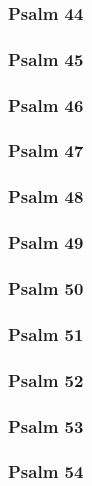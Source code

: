 \documentclass[10pt]{extarticle}
\begin{document}
\begin{multicols}{2}
\subsubsection{Psalm 44}

\newpage

\subsubsection{Psalm 45}

\newpage

\subsubsection{Psalm 46}

\newpage

\subsubsection{Psalm 47}

\newpage

\subsubsection{Psalm 48}

\newpage

\subsubsection{Psalm 49}

\newpage

\subsubsection{Psalm 50}

\newpage

\subsubsection{Psalm 51}

\newpage

\subsubsection{Psalm 52}

\newpage

\subsubsection{Psalm 53}

\newpage

\subsubsection{Psalm 54}

\newpage


\end{multicols}
\end{document}
